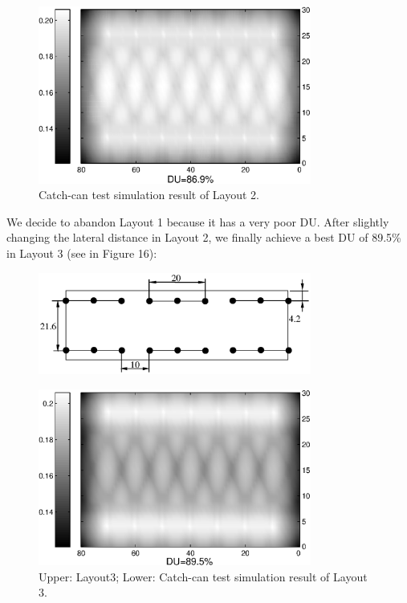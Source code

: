 \documentclass[12pt,a4paper,titlepage]{article}
\begin{document}
\begin{figure}[!htb]
\centering
\includegraphics[width=0.8\textwidth]{fig15.eps} \caption{\label{fig15} Catch-can test simulation result of Layout 2. }
\end{figure}

We decide to abandon Layout 1 because it has a very poor DU. After
slightly changing the lateral distance in Layout 2, we finally
achieve a best DU of 89.5\% in Layout 3 (see in Figure 16):
\newpage

\begin{figure}[!htb]
\centering
\includegraphics[width=0.8\textwidth]{fig161.eps}
\end{figure}

\begin{figure}[!htb]
\centering
\includegraphics[width=0.8\textwidth]{fig162.eps}
\caption{\label{fig16} Upper: Layout3; Lower: Catch-can test
simulation result of Layout 3. }
\end{figure}
\end{document}
